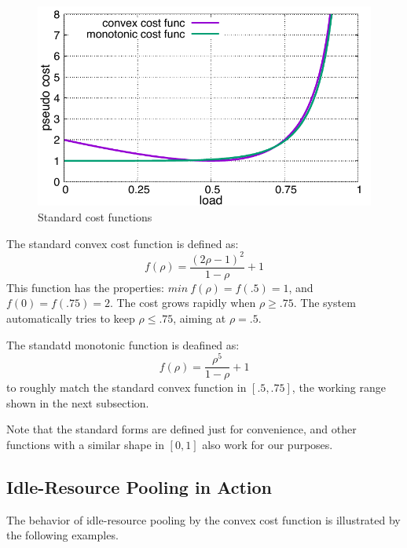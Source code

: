 \begin{figure}[tb]
  \begin{center}
    \includegraphics[width=1.0\columnwidth]{costfunc.pdf}
    \vspace{-2.0ex}
    \caption{Standard cost functions}
    \label{fig:std_costfunc}
  \end{center}
\end{figure}

The standard convex cost function is defined as:
\begin{equation*}
	f(\rho) = \frac{(2\rho - 1)^{2}}{1 - \rho} + 1
\end{equation*}
This function has the properties:
$min\: f(\rho) = f(.5) = 1$, and $f(0) = f(.75) = 2$.
The cost grows rapidly when $\rho \ge .75$.
The system automatically tries to keep $\rho \le .75$,
aiming at $\rho = .5$.

The standatd monotonic function is deafined as:
\begin{equation*}
	f(\rho) = \frac{\rho^{5}}{1 - \rho} + 1
\end{equation*}
to roughly match the standard convex function in $[.5, .75]$,
the working range shown in the next subsection.

Note that the standard forms are defined just for convenience, and
other functions with a similar shape in $[0,1]$ also work for our
purposes.

\subsection{Idle-Resource Pooling in Action}

The behavior of idle-resource pooling by the convex cost function is
illustrated by the following examples.

